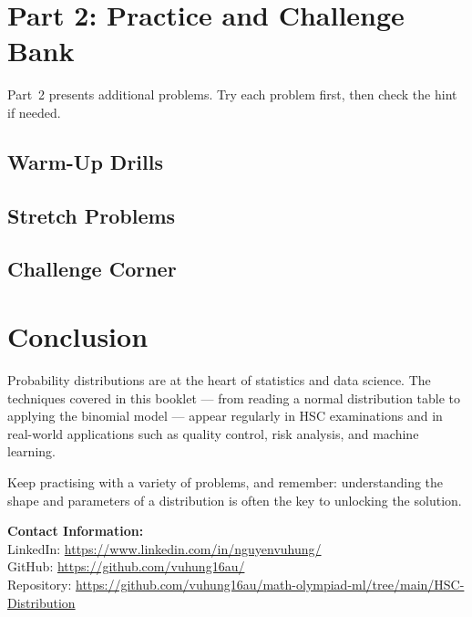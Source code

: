 \documentclass[12pt]{article}
\begin{document}
\section{Part 2: Practice and Challenge Bank}

Part~2 presents additional problems. Try each problem first, then check the hint if needed.

\subsection{Warm-Up Drills}


\subsection{Stretch Problems}


\subsection{Challenge Corner}


\section{Conclusion}

Probability distributions are at the heart of statistics and data science. The techniques covered in this booklet --- from reading a normal distribution table to applying the binomial model --- appear regularly in HSC examinations and in real-world applications such as quality control, risk analysis, and machine learning.

Keep practising with a variety of problems, and remember: understanding the shape and parameters of a distribution is often the key to unlocking the solution.

\vspace{2em}
\noindent\textbf{Contact Information:}\\[0.5em]
LinkedIn: \href{https://www.linkedin.com/in/nguyenvuhung/}{https://www.linkedin.com/in/nguyenvuhung/}\\[0.3em]
GitHub: \href{https://github.com/vuhung16au/}{https://github.com/vuhung16au/}\\[0.3em]
Repository: \href{https://github.com/vuhung16au/math-olympiad-ml/tree/main/HSC-Distribution}{https://github.com/vuhung16au/math-olympiad-ml/tree/main/HSC-Distribution}
\end{document}
